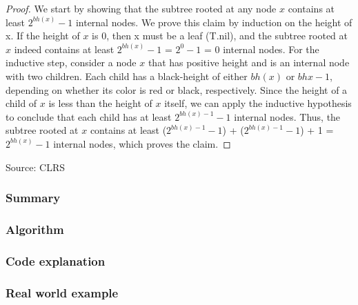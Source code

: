 \documentclass[10pt]{article}
\begin{document}
\begin{proof}
  We start by showing that the subtree rooted at any node $x$ contains at least
  $2^{bh(x)} - 1$ internal nodes. We prove this claim by induction on the height
  of x. If the height of $x$ is 0, then x must be a leaf (T.nil), and the
  subtree rooted at $x$ indeed contains at least $2^{bh(x)} - 1$ = $2^0 - 1$ = 0
  internal nodes. For the inductive step, consider a node $x$ that has positive
  height and is an internal node with two children. Each child has a
  black-height of either $bh(x)$ or $bhx - 1$, depending on whether its color is
  red or black, respectively. Since the height of a child of $x$ is less than
  the height of $x$ itself, we can apply the inductive hypothesis to conclude
  that each child has at least $2^{bh(x) - 1} - 1$ internal nodes. Thus, the
  subtree rooted at $x$ contains at least ($2^{bh(x) - 1} - 1$) + ($2^{bh(x) - 1} -
  1$) + 1 = $2^{bh(x)} - 1$ internal nodes, which proves the claim.
\end{proof}

\noindent
Source: CLRS

\subsubsection*{Summary}

\subsubsection*{Algorithm}

\subsubsection*{Code explanation}

\subsubsection*{Real world example}
\end{document}
